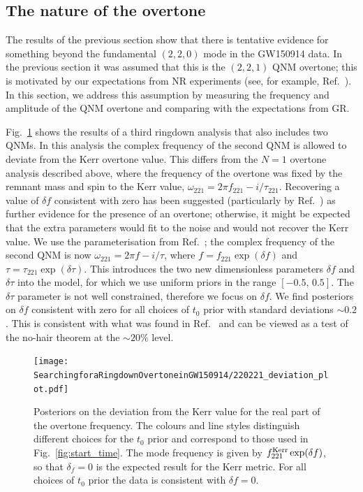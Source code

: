 \subsection{The nature of the overtone}\label{subsec:verify}

The results of the previous section show that there is tentative evidence for something beyond the fundamental $(2,2,0)$ mode in the GW150914 data. 
In the previous section it was assumed that this is the $(2,2,1)$ QNM overtone; this is motivated by our expectations from NR experiments (see, for example, Ref.~\cite{Giesler:2019uxc}). 
In this section, we address this assumption by measuring the frequency and amplitude of the QNM overtone and comparing with the expectations from GR.

Fig.~\ref{fig:delta_f} shows the results of a third ringdown analysis that also includes two QNMs.
In this analysis the complex frequency of the second QNM is allowed to deviate from the Kerr overtone value. 
This differs from the $N=1$ overtone analysis described above, where the frequency of the overtone was fixed by the remnant mass and spin to the Kerr value, $\omega_{221} = 2\pi f_{221} - i/\tau_{221}$.
Recovering a value of $\delta f$ consistent with zero has been suggested (particularly by Ref.~\cite{Isi:2022mhy}) as further evidence for the presence of an overtone; otherwise, it might be expected that the extra parameters would fit to the noise and would not recover the Kerr value.
We use the parameterisation from Ref.~\cite{Isi:2022mhy}; the complex frequency of the second QNM is now $\omega_{221} = 2\pi f-i/\tau$, where $f=f_{221}\exp(\delta f)$ and $\tau=\tau_{221}\exp(\delta \tau)$. 
This introduces the two new dimensionless parameters $\delta f$ and $\delta \tau$ into the model, for which we use uniform priors in the range $[-0.5,\, 0.5]$.
The $\delta \tau$ parameter is not well constrained, therefore we focus on $\delta f$.
We find posteriors on $\delta f$ consistent with zero for all choices of $t_0$ prior with standard deviations $\sim 0.2$. 
This is consistent with what was found in Ref.~\cite{Isi:2019aib} and can be viewed as a test of the no-hair theorem at the $\sim 20\%$ level.

\begin{figure}[t]
    \centering
    \texttt{[image: SearchingforaRingdownOvertoneinGW150914/220221\_deviation\_plot.pdf]}
    \caption[Posteriors on the deviation from Kerr for the real part of the GW150914 overtone frequency for each choice of the ringdown start-time prior]{ 
    Posteriors on the deviation from the Kerr value for the real part of the overtone frequency.
    The colours and line styles distinguish different choices for the $t_0$ prior and correspond to those used in Fig.~\ref{fig:start_time}.
    The mode frequency is given by $f_{221}^{\rm Kerr} \exp(\delta f)$, so that $\delta_f=0$ is the expected result for the Kerr metric.
    For all choices of $t_0$ prior the data is consistent with $\delta f=0$.
    }
    \label{fig:delta_f}
\end{figure}

